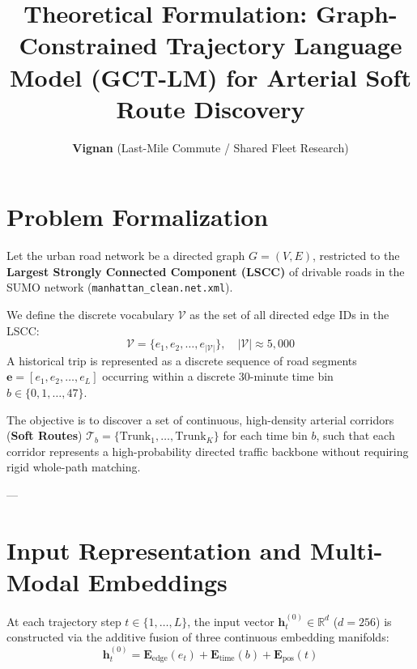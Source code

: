 \documentclass[11pt,a4paper]{article}
\title{\vspace{-1.5em}\textbf{Theoretical Formulation: Graph-Constrained Trajectory Language Model (GCT-LM) for Arterial Soft Route Discovery}\vspace{-0.5em}}
\author{\textbf{Vignan} \quad (Last-Mile Commute / Shared Fleet Research)}
\date{\vspace{-1.5em}}
\begin{document}
\maketitle

\section{Problem Formalization}

Let the urban road network be a directed graph $G = (V, E)$, restricted to the \textbf{Largest Strongly Connected Component (LSCC)} of drivable roads in the SUMO network (\texttt{manhattan\_clean.net.xml}). 

We define the discrete vocabulary $\mathcal{V}$ as the set of all directed edge IDs in the LSCC:
\begin{equation}
\mathcal{V} = \{ e_1, e_2, \dots, e_{|\mathcal{V}|} \}, \quad |\mathcal{V}| \approx 5{,}000
\end{equation}
A historical trip is represented as a discrete sequence of road segments $\mathbf{e} = [e_1, e_2, \dots, e_L]$ occurring within a discrete 30-minute time bin $b \in \{0, 1, \dots, 47\}$. 

The objective is to discover a set of continuous, high-density arterial corridors (\textbf{Soft Routes}) $\mathcal{T}_b = \{\text{Trunk}_1, \dots, \text{Trunk}_K\}$ for each time bin $b$, such that each corridor represents a high-probability directed traffic backbone without requiring rigid whole-path matching.

---

\section{Input Representation and Multi-Modal Embeddings}

At each trajectory step $t \in \{1, \dots, L\}$, the input vector $\mathbf{h}_t^{(0)} \in \mathbb{R}^d$ ($d = 256$) is constructed via the additive fusion of three continuous embedding manifolds:
\begin{equation}
\mathbf{h}_t^{(0)} = \mathbf{E}_{\text{edge}}(e_t) + \mathbf{E}_{\text{time}}(b) + \mathbf{E}_{\text{pos}}(t)
\end{equation}
\end{document}
